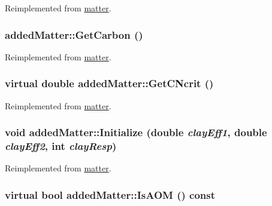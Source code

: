 Reimplemented from \hyperlink{classmatter_a36bd225841eda2240009df17d239cfa1}{matter}.\hypertarget{classadded_matter_aa0c64a25840e1a117b686bb779403147}{
\subsubsection[{GetCarbon}]{ addedMatter::GetCarbon ()}}
\label{classadded_matter_aa0c64a25840e1a117b686bb779403147}


Reimplemented from \hyperlink{classmatter_ae85f8f64ea546c5cbe056c641304b514}{matter}.\hypertarget{classadded_matter_ac2d053d776783effa120e93de55c41ea}{
\subsubsection[{GetCNcrit}]{\setlength{\rightskip}{0pt plus 5cm}virtual double addedMatter::GetCNcrit ()}}
\label{classadded_matter_ac2d053d776783effa120e93de55c41ea}


Reimplemented from \hyperlink{classmatter_a111bf6b7c88f61e75ed50eac1fc8c3b7}{matter}.\hypertarget{classadded_matter_a8b9b2332722afe8a6ad0a3b833d095dd}{
\subsubsection[{Initialize}]{\setlength{\rightskip}{0pt plus 5cm}void addedMatter::Initialize (double {\em clayEff1}, \/  double {\em clayEff2}, \/  int {\em clayResp})}}
\label{classadded_matter_a8b9b2332722afe8a6ad0a3b833d095dd}


Reimplemented from \hyperlink{classmatter_adeae5b9c4239d6c02c19e04d346e6d10}{matter}.\hypertarget{classadded_matter_a124a49cad0765fff9147d7cb3e3f768e}{
\subsubsection[{IsAOM}]{\setlength{\rightskip}{0pt plus 5cm}virtual bool addedMatter::IsAOM () const}}
\label{classadded_matter_a124a49cad0765fff9147d7cb3e3f768e}


